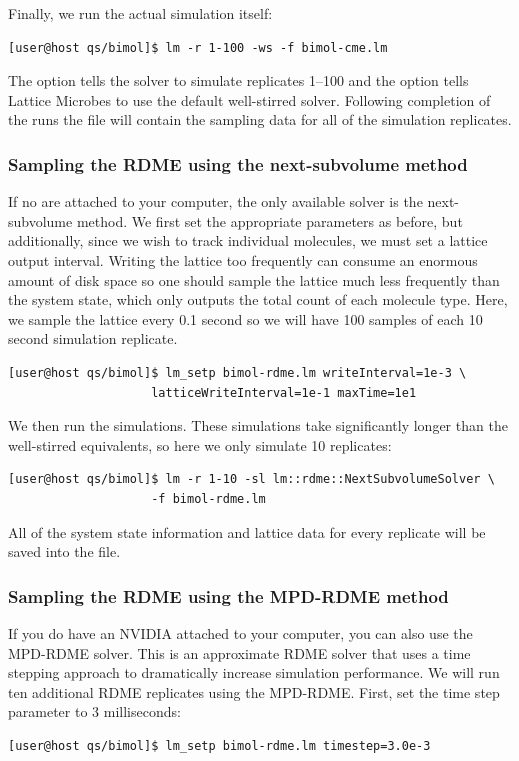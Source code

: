 Finally, we run the actual simulation itself:
{\small\begin{verbatim}
[user@host qs/bimol]$ lm -r 1-100 -ws -f bimol-cme.lm
\end{verbatim}}
The  option tells the solver to simulate replicates 1--100 and the  option tells Lattice Microbes to use the default well-stirred solver. Following completion of the runs the  file will contain the sampling data for all of the simulation replicates.

\subsubsection{Sampling the RDME using the next-subvolume method}

If no  are attached to your computer, the only available  solver is the next-subvolume method. We first set the appropriate parameters as before, but additionally, since we wish to track individual molecules, we must set a lattice output interval. Writing the lattice too frequently can consume an enormous amount of disk space so one should sample the lattice much less frequently than the system state, which only outputs the total count of each molecule type. Here, we sample the lattice every 0.1 second so we will have 100 samples of each 10 second simulation replicate.
{\small\begin{verbatim}
[user@host qs/bimol]$ lm_setp bimol-rdme.lm writeInterval=1e-3 \
                    latticeWriteInterval=1e-1 maxTime=1e1
\end{verbatim}}

We then run the  simulations. These simulations take significantly longer than the well-stirred equivalents, so here we only simulate 10 replicates:
{\small\begin{verbatim}
[user@host qs/bimol]$ lm -r 1-10 -sl lm::rdme::NextSubvolumeSolver \
                    -f bimol-rdme.lm
\end{verbatim}}

All of the system state information and lattice data for every replicate will be saved into the  file.

\subsubsection{Sampling the RDME using the MPD-RDME method}

If you do have an NVIDIA  attached to your computer, you can also use the MPD-RDME solver. This is an approximate RDME solver that uses a time stepping approach to dramatically increase simulation performance. We will run ten additional RDME replicates using the MPD-RDME. First, set the time step parameter to 3 milliseconds:
{\small\begin{verbatim}
[user@host qs/bimol]$ lm_setp bimol-rdme.lm timestep=3.0e-3
\end{verbatim}}

